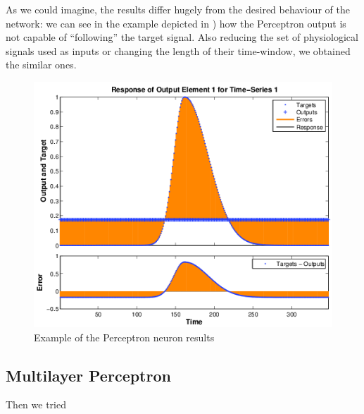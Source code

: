 As we could imagine, the results differ hugely from the desired behaviour of the network: we can see in the example depicted in ) how the Perceptron output is not capable of ``following'' the target signal.
Also reducing the set of physiological signals used as inputs or changing the length of their time-window, we obtained the similar ones.
\begin{figure}[!ht]
\centering
\includegraphics[width=0.7\columnwidth]{images/results/perceptronResults}
\caption{Example of the Perceptron neuron results}
\label{fig:perceptronResults}
\end{figure}


\subsection{Multilayer Perceptron}
\label{subsec:mlpapplication}
Then we tried

